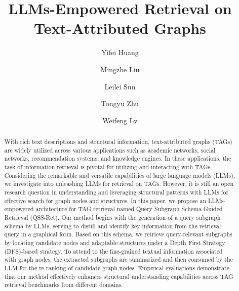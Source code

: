 \documentclass[runningheads]{llncs}
\begin{document}
%
\title{LLMs-Empowered Retrieval on Text-Attributed Graphs}
%
%
\author{Yifei Huang \and
Mingzhe Liu\and
Leilei Sun
\and
Tongyu Zhu
\and
Weifeng Lv
}
%
%

\maketitle              %
%
\begin{abstract}
With rich text descriptions and structural information, text-attributed graphs (TAGs) are widely utilized across various applications such as academic networks, social networks, recommendation systems, and knowledge engines. 
In these applications, the task of information retrieval is pivotal for utilizing and interacting with TAGs.
Considering the remarkable and versatile capabilities of large language models (LLMs), we investigate into unleashing LLMs for retrieval on TAGs.
However, it is still an open research question in understanding and leveraging structural patterns with LLMs for effective search for graph nodes and structures.
In this paper, we propose an LLMs-empowered architecture for TAG retrieval named Query Subgraph Schema Guided Retrieval (QSS-Ret).
Our method begins with the generation of a query subgraph schema by LLMs, serving to distill and identify key information from the retrieval query in a graphical form. 
Based on this schema, we retrieve query-relevant subgraphs by locating candidate nodes and adaptable structures under a Depth First Strategy (DFS)-based strategy.
To attend to the fine-grained textual information associated with graph nodes, the extracted subgraphs are summarized and then consumed by the LLM for the re-ranking of candidate graph nodes.
Empirical evaluations demonstrate that our method effectively enhances structural understanding capabilities across TAG retrieval benchmarks from different domains.

\end{abstract}
%
%
%

\end{document}
